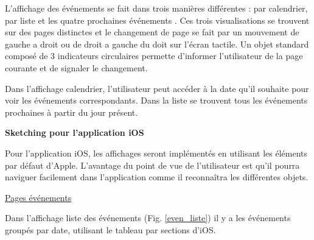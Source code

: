\documentclass[a4paper, 11px]{article}
\begin{document}
L'affichage des événements se fait dans trois manières différentes : par calendrier, par liste et les quatre prochaines événements . Ces trois visualisations se trouvent sur des pages distinctes et le changement de page se fait par un mouvement de gauche a droit ou de droit a gauche du doit sur l'écran tactile. Un objet standard composé de 3 indicateurs circulaires permette d'informer l'utilisateur de la page courante et de signaler le changement.

Dans l'affichage calendrier, l'utilisateur peut accéder à la date qu'il souhaite pour voir les événements correspondants. Dans la liste se trouvent tous les événements prochaines à partir du jour présent.


\textbf{Sketching pour l'application iOS}

Pour l'application iOS, les affichages seront implémentés en utilisant les éléments par défaut d'Apple. L'avantage du point de vue de l'utilisateur est qu'il pourra naviguer facilement dans l'application comme il reconnaîtra les différentes objets.

\underline{Pages événements}

Dans l'affichage liste des événements (Fig. \ref{even_liste}) il y a les événements groupés par date, utilisant le tableau par sections d'iOS. 
\end{document}

